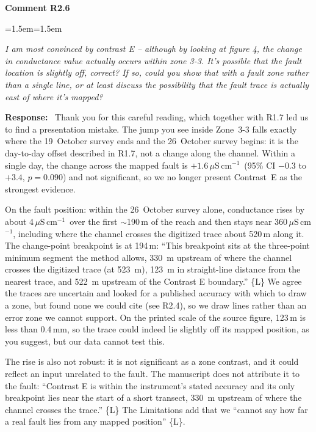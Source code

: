 \documentclass[11pt]{article}
\newcommand{\uScm}{\,$\mu$S\,cm$^{-1}$}
\newenvironment{comment}[1]
  {\par\medskip\noindent\textbf{Comment #1}\par
   \begin{list}{}{\leftmargin=1.5em\rightmargin=1.5em}\item\color{commentcolor}\itshape}
  {\end{list}}
\newenvironment{response}
  {\par\noindent\textbf{Response:}\ }
  {\par}
\newcommand{\Ln}[1]{\{L\Lref{L:#1}\}}
\newcommand{\mq}[1]{``#1''}
\begin{document}
\begin{comment}{R2.6}
I am most convinced by contrast E -- although by looking at figure 4, the change in
conductance value actually occurs within zone 3-3. It's possible that the fault location is
slightly off, correct? If so, could you show that with a fault zone rather than a single
line, or at least discuss the possibility that the fault trace is actually east of where
it's mapped?
\end{comment}
\begin{response}
Thank you for this careful reading, which together with R1.7 led us to find a presentation mistake. The jump you
see inside Zone~3-3 falls exactly where the 19~October survey ends and the 26~October survey
begins: it is the day-to-day offset described in R1.7, not a change along the channel. Within a
single day, the change across the mapped fault is $+1.6$\uScm\
(95\% CI $-0.3$ to $+3.4$, $p = 0.090$) and not significant, so we no longer present
Contrast~E as the strongest evidence.

On the fault position: within the 26~October survey alone, conductance rises by about
4\uScm\ over the first $\sim$190\,m of the reach and then stays near 360\uScm, including where
the channel crosses the digitized trace about 520\,m along it. The change-point breakpoint is at
194\,m: \mq{This breakpoint sits at the three-point minimum segment the method allows, 330~m upstream
of where the channel crosses the digitized trace (at 523~m), 123~m in straight-line distance from
the nearest trace, and 522~m upstream of the Contrast E boundary.} \Ln{cp-E-min} We agree the
traces are uncertain and looked for a published accuracy with which to draw a zone, but found
none we could cite (see R2.4), so we draw lines rather than an error zone we cannot support. On the printed scale of the
source figure, 123\,m is less than 0.4\,mm, so the trace could indeed lie slightly off its
mapped position, as you suggest, but our data cannot test this.

The rise is also not robust: it is not significant as a zone contrast, and it could reflect an input unrelated to the fault. The
manuscript does not attribute it to the fault: \mq{Contrast E is within the instrument's stated
accuracy and its only breakpoint lies near the start of a short transect, 330~m upstream of
where the channel crosses the trace.} \Ln{disc-E} The Limitations add that we \mq{cannot say how far a real fault lies from any mapped position}
\Ln{lim-faultpos}.
\end{response}
\end{document}
